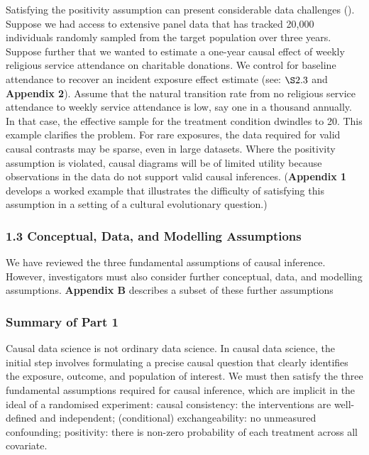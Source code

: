 \documentclass[
  singlecolumn]{article}
\begin{document}
Satisfying the positivity assumption can present considerable data
challenges ().
Suppose we had access to extensive panel data that has tracked 20,000
individuals randomly sampled from the target population over three
years. Suppose further that we wanted to estimate a one-year causal
effect of weekly religious service attendance on charitable donations.
We control for baseline attendance to recover an incident exposure
effect estimate (see: \(\S 2.3\) and \textbf{Appendix 2}). Assume that
the natural transition rate from no religious service attendance to
weekly service attendance is low, say one in a thousand annually. In
that case, the effective sample for the treatment condition dwindles to
20. This example clarifies the problem. For rare exposures, the data
required for valid causal contrasts may be sparse, even in large
datasets. Where the positivity assumption is violated, causal diagrams
will be of limited utility because observations in the data do not
support valid causal inferences. (\textbf{Appendix 1} develops a worked
example that illustrates the difficulty of satisfying this assumption in
a setting of a cultural evolutionary question.)

\subsubsection{1.3 Conceptual, Data, and Modelling
Assumptions}\label{conceptual-data-and-modelling-assumptions}

We have reviewed the three fundamental assumptions of causal inference.
However, investigators must also consider further conceptual, data, and
modelling assumptions. \textbf{Appendix B} describes a subset of these
further assumptions

\subsubsection{Summary of Part 1}\label{summary-of-part-1}

Causal data science is not ordinary data science. In causal data
science, the initial step involves formulating a precise causal question
that clearly identifies the exposure, outcome, and population of
interest. We must then satisfy the three fundamental assumptions
required for causal inference, which are implicit in the ideal of a
randomised experiment: causal consistency: the interventions are
well-defined and independent; (conditional) exchangeability: no
unmeasured confounding; positivity: there is non-zero probability of
each treatment across all covariate.
\end{document}

